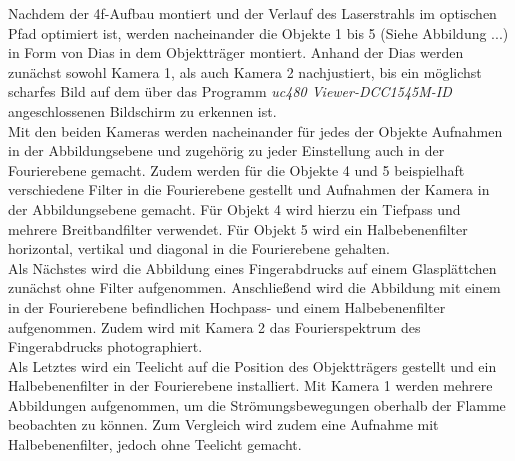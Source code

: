 Nachdem der 4f-Aufbau montiert und der Verlauf des Laserstrahls im optischen Pfad optimiert ist, werden nacheinander die Objekte 1 bis 5 (Siehe Abbildung ...) in Form von Dias in dem Objektträger montiert. Anhand der Dias werden zunächst sowohl Kamera 1, als auch Kamera 2 nachjustiert, bis ein möglichst scharfes Bild auf dem über das Programm \textit{uc480 Viewer-DCC1545M-ID} angeschlossenen Bildschirm zu erkennen ist.  \\
Mit den beiden Kameras werden nacheinander für jedes der Objekte Aufnahmen in der Abbildungsebene und zugehörig zu jeder Einstellung auch in der Fourierebene gemacht. Zudem werden für die Objekte 4 und 5 beispielhaft verschiedene Filter in die Fourierebene gestellt und Aufnahmen der Kamera in der Abbildungsebene gemacht. Für Objekt 4 wird hierzu ein Tiefpass und mehrere Breitbandfilter verwendet. Für Objekt 5 wird ein Halbebenenfilter horizontal, vertikal und diagonal in die Fourierebene gehalten. \\

Als Nächstes wird die Abbildung eines Fingerabdrucks auf einem Glasplättchen zunächst ohne Filter aufgenommen. Anschließend wird die Abbildung mit einem in der Fourierebene befindlichen Hochpass- und einem Halbebenenfilter aufgenommen. Zudem wird mit Kamera 2 das Fourierspektrum des Fingerabdrucks photographiert. \\

Als Letztes wird ein Teelicht auf die Position des Objektträgers gestellt und ein Halbebenenfilter in der Fourierebene installiert. Mit Kamera 1 werden mehrere Abbildungen aufgenommen, um die Strömungsbewegungen oberhalb der Flamme beobachten zu können. 
Zum Vergleich wird zudem eine Aufnahme mit Halbebenenfilter, jedoch ohne Teelicht gemacht. 





